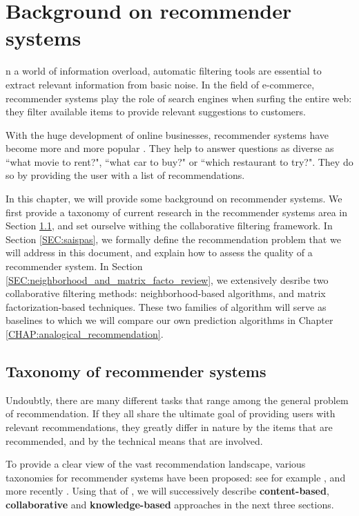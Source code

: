 \chapter{Background on recommender systems}

n a world of information overload, automatic filtering tools are
essential to extract relevant information from basic noise. In the field of
e-commerce, recommender systems play the role of search engines when surfing
the entire web: they filter available items to provide relevant suggestions to
customers.

With the huge development of online businesses, recommender systems have become
more and more popular \cite{RecoSystemHandbook,AdoTuzIEEE2005}. They help to
answer questions as diverse as ``what movie to rent?", ``what car to buy?" or
``which restaurant to try?".  They do so by providing the user with a list of
recommendations.

In this chapter, we will provide some background on recommender systems. We
first provide a taxonomy of current research in the recommender systems area in
Section \ref{SEC:taxonomy_rec_sys}, and set ourselve withing the collaborative filtering
framework. In Section \ref{SEC:saispas}, we formally define the recommendation problem
that we will address in this document, and explain how to assess the quality of
a recommender system. In Section
\ref{SEC:neighborhood_and_matrix_facto_review}, we extensively desribe two
collaborative filtering methods: neighborhood-based algorithms, and matrix
factorization-based techniques. These two families of algorithm will serve as
baselines to which we will compare our own prediction algorithms in Chapter
\ref{CHAP:analogical_recommendation}.

\section{Taxonomy of recommender systems}
\label{SEC:taxonomy_rec_sys}

Undoubtly, there are many different tasks that range among the general problem
of recommendation. If they all share the ultimate goal of providing users with
relevant recommendations, they greatly differ in nature by the items that are
recommended, and by the technical means that are involved.

To provide a clear view of the vast recommendation landscape, various taxonomies
for recommender systems have been proposed: see for example \cite{Bur02,
AdoTuzIEEE2005, Bur07}, and more recently \cite{BurRam11}. Using that of
\cite{BurRam11}, we will successively describe \textbf{content-based},
\textbf{collaborative} and \textbf{knowledge-based} approaches in the next
three sections.

